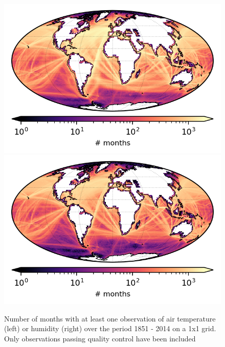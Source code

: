 \begin{figure}[h]
    \centering
    \includegraphics{resources/observations-at-months-map-optimal.png}
    \includegraphics{resources/observations-dpt-months-map-optimal.png}
    \caption{Number of months with at least one observation of air temperature (left) or humidity (right) over the period 1851 - 2014 on a 1x1 grid. Only observations passing quality control have been included}
    \label{fig:at-nmonths-map}
\end{figure}

\FloatBarrier
